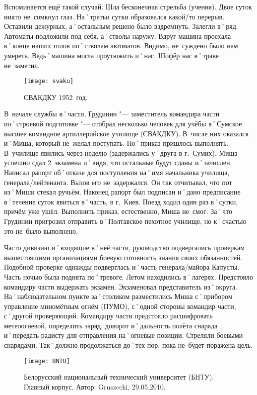 Вспоминается ещё такой случай. Шла бесконечная стрельба (учения). Двое суток никто не~сомкнул глаз. На˚третьи сутки образовался какой\=/то перерыв. Оставили дежурных, а˚остальным решено было вздремнуть. Залегли в˚ряд. Автоматы подложили под себя, а˚стволы наружу. Вдруг машина проехала в˚конце наших голов по˚стволам автоматов. Видимо, не~суждено было нам умереть. Ведь˚машина могла проутюжить и˚нас. Шофёр нас в˚траве не~заметил.

\begin{wrapfigure}{O}{.4\textwidth}
\centering
\texttt{[image: svaku]}
\caption[СВАКДКУ 1952~год.]{СВАКДКУ 1952~год\footnotemark.}
\label{fig:svaku}
\end{wrapfigure}

В~начале службы в˚части, Грудинин "--- заместитель командира части по˚строевой подготовке "--- отобрал несколько человек для учёбы в˚Сумское высшее командное артиллерийское училище (СВАКДКУ). В~числе них оказался и˚Миша, который не~желал поступать. Но˚приказ пришлось выполнять. В~училище явились через неделю (задержались у˚друга в г.~Сумих). Миша успешно сдал 2~экзамена и˚видя, что остальные будут сданы и˚зачислен. Написал рапорт об˚отказе для поступления на˚имя начальника училища, генерала\-/лейтенанта. Вызов его не~задержался. Он так отчитывал, что пот из˚Миши стекал ручьём. Наконец рапорт был подписан и˚дано предписание в˚течение суток явиться в˚часть, в г.~Киев. Поезд ходил один раз в˚сутки, причём уже ушёл. Выполнить приказ, естественно, Миша не~смог. За˚что Грудинин пригрозил отправить в˚Полтавское пехотное училище, но к˚счастью это не~было выполнено. 

Часто дивизию и˚входящие в˚неё части, руководство подвергались проверкам вышестоящими организациями боевую готовность знания своих обязанностей. Подобной проверке однажды подверглась и˚часть генерала\-/майора Капусты. Часть ночью была поднята по˚тревоге. Летом находились в˚лагерях. Предстояло командиру части выдержать экзамен. Экзаменовал представитель из˚округа. На˚наблюдательном пункте за˚столиком разместились Миша с˚прибором управление миномётным огнём (ПУМО), с˚одной стороны командир части, с˚другой проверяющий. Командиру части предстояло расшифровать метеоогневой, определить заряд, доворот и˚дальность полёта снаряда и˚передать радисту для отправления на˚огневые позиции. Стреляли боевыми снарядами. Так˚должно продолжаться до˚тех пор, пока не~будет поражена цель. 

\begin{wrapfigure}{O}{.4\textwidth}
\centering
\texttt{[image: BNTU]}
\caption{Белорусский национальный технический университет (БНТУ). Главный корпус. Автор: Gruszecki, 29.05.2010.}
\label{fig:BNTU}
\end{wrapfigure}

